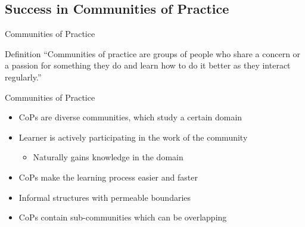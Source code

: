\subsection{Success in Communities of Practice}
\begin{frame}{Communities of Practice}
  \begin{block}{Definition}
    ``Communities of practice are groups of people who share a concern or a
    passion for something they do and learn how to do it better as they interact regularly.'' \cite{Weng98}
  \end{block}
\end{frame}

\begin{frame}{Communities of Practice}
  \begin{itemize}
    \item CoPs are diverse communities, which study a certain domain
    \item Learner is actively participating in the work of the community
    \begin{itemize}
        \item Naturally gains knowledge in the domain
    \end{itemize}
    \item CoPs make the learning process easier and faster \cite{CuZe05}
    \item Informal structures with permeable boundaries \cite{RKJa15}
    \item CoPs contain sub-communities which can be overlapping
  \end{itemize}
\end{frame}


